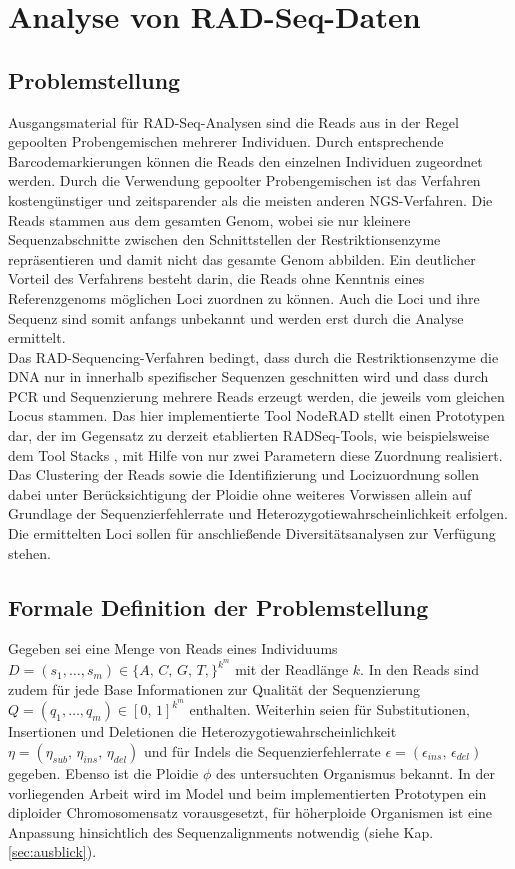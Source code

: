 \chapter{Analyse von RAD-Seq-Daten} \label{chapter:kap2}
\section{Problemstellung} \label{sec:probl}

Ausgangsmaterial für RAD-Seq-Analysen sind die Reads aus in der Regel gepoolten Probengemischen mehrerer Individuen. Durch entsprechende Barcodemarkierungen können die Reads den einzelnen Individuen zugeordnet werden. Durch die Verwendung gepoolter Probengemischen ist das Verfahren kostengünstiger und zeitsparender als die meisten anderen NGS-Verfahren. Die Reads stammen aus dem gesamten Genom, wobei sie nur kleinere Sequenzabschnitte zwischen den Schnittstellen der Restriktionsenzyme repräsentieren und damit nicht das gesamte Genom abbilden. Ein deutlicher Vorteil des Verfahrens besteht darin, die Reads ohne Kenntnis eines Referenzgenoms möglichen Loci zuordnen zu können. Auch die Loci und ihre Sequenz sind somit anfangs unbekannt und werden erst durch die Analyse ermittelt.\\

Das RAD-Sequencing-Verfahren bedingt, dass durch die Restriktionsenzyme die DNA nur in innerhalb spezifischer Sequenzen geschnitten wird und dass durch PCR und Sequenzierung mehrere Reads erzeugt werden, die jeweils vom gleichen Locus stammen. Das hier implementierte Tool NodeRAD stellt einen Prototypen dar, der im Gegensatz zu derzeit etablierten RADSeq-Tools, wie beispielsweise dem Tool Stacks \cite{catchen_2013}, mit Hilfe von nur zwei Parametern diese Zuordnung realisiert. Das Clustering der Reads sowie die Identifizierung und Locizuordnung sollen dabei unter Berücksichtigung der Ploidie ohne weiteres Vorwissen allein auf Grundlage der Sequenzierfehlerrate und Heterozygotiewahrscheinlichkeit erfolgen. Die ermittelten Loci sollen für anschließende Diversitätsanalysen zur Verfügung stehen. 

\section{Formale Definition der Problemstellung} \label{sec:formal}

Gegeben sei eine Menge von Reads eines Individuums $ D = (s_{1}, \dots , s_{m}) \in \{A,\,C,\,G,\,T,\}^{k^m}$ mit der Readlänge $k$. In den Reads sind zudem für jede Base Informationen zur Qualität der Sequenzierung $ Q = (q_{1}, \dots , q_{m}) \in {[0,\,1]}^{k^m}$ enthalten. Weiterhin seien für Substitutionen, Insertionen und Deletionen die Heterozygotiewahrscheinlichkeit $\eta = (\eta_{sub},\, \eta_{ins},\, \eta_{del}) $ und für Indels die Sequenzierfehlerrate $\epsilon=(\epsilon_{ins},\, \epsilon_{del})$ gegeben. Ebenso ist die Ploidie $\phi$ des untersuchten Organismus bekannt. In der vorliegenden Arbeit wird im Model und beim implementierten Prototypen ein diploider Chromosomensatz vorausgesetzt, für höherploide Organismen ist eine Anpassung hinsichtlich des Sequenzalignments notwendig (siehe Kap. \ref{sec:ausblick}). \\


